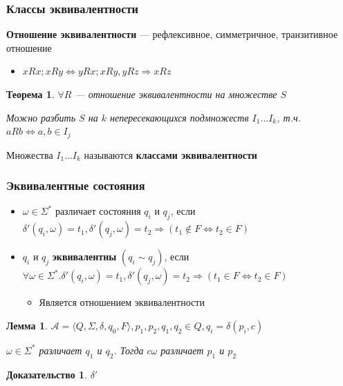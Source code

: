 \documentclass{beamer}
\newtheorem{rutheorem}{Теорема}
\newtheorem{ruproof}{Доказательство}
\newtheorem{rulemma}{Лемма}
\begin{document}
\begin{frame}[fragile]
  \transwipe[direction=90]
  \frametitle{Классы эквивалентности}
    \textbf{Отношение эквивалентности} --- рефлексивное, симметричное, транзитивное отношение
    \begin{itemize}
      \item $xRx; xRy \Leftrightarrow yRx; xRy, yRz \Rightarrow xRz$
    \end{itemize}
    
    \begin{rutheorem}
       $\forall R$ --- отношение эквивалентности на множестве $S$
      
      Можно разбить $S$ на $k$ непересекающихся подмножеств $I_1 \dots I_k$, т.ч. $aRb \Leftrightarrow a, b \in I_j$
    \end{rutheorem}
    
    Множества $I_1 \dots I_k$ называются \textbf{классами эквивалентности}
\end{frame}

\begin{frame}[fragile]
  \transwipe[direction=90]
  \frametitle{Эквивалентные состояния}
  \begin{itemize}
    \item $\omega \in \Sigma^*$ различает состояния $q_i$ и $q_j$, если $\delta' (q_i, \omega) = t_1, \delta' (q_j, \omega) = t_2 \Rightarrow (t_1 \notin F \Leftrightarrow t_2 \in F)$
    \item $q_i$ и $q_j$ \textbf{эквивалентны} $(q_i \sim q_j)$, если $\forall \omega \in \Sigma^*. \delta' (q_i, \omega) = t_1, \delta' (q_j, \omega) = t_2 \Rightarrow (t_1 \in F \Leftrightarrow t_2 \in F)$
    \begin{itemize}
      \item Является отношением эквивалентности
    \end{itemize}
  \end{itemize}
   \begin{rulemma}
      $\mathcal{A} = \langle Q, \Sigma, \delta, q_0, F \rangle, p_1, p_2, q_1, q_2 \in Q, q_i = \delta(p_i, c)$
      
      $\omega \in \Sigma^*$ различает $q_1$ и $q_2$. Тогда $c \omega$ различает $p_1$ и $p_2$
   \end{rulemma}
   
   \begin{ruproof}
     $\delta' $
   \end{ruproof}
\end{frame}
\end{document}
